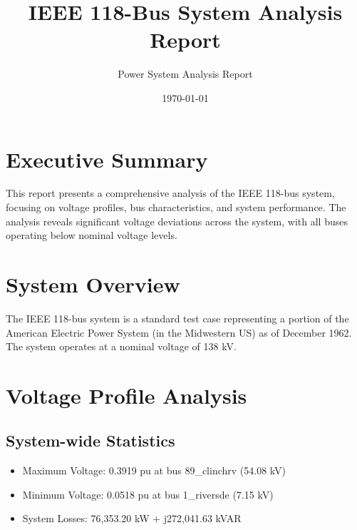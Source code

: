 \documentclass[11pt]{article}
\title{IEEE 118-Bus System Analysis Report}
\author{Power System Analysis Report}
\date{\today}
\begin{document}
\maketitle

\section{Executive Summary}
This report presents a comprehensive analysis of the IEEE 118-bus system, focusing on voltage profiles, bus characteristics, and system performance. The analysis reveals significant voltage deviations across the system, with all buses operating below nominal voltage levels.

\section{System Overview}
The IEEE 118-bus system is a standard test case representing a portion of the American Electric Power System (in the Midwestern US) as of December 1962. The system operates at a nominal voltage of 138 kV.

\section{Voltage Profile Analysis}

\subsection{System-wide Statistics}
\begin{itemize}
    \item Maximum Voltage: 0.3919 pu at bus 89\_clinchrv (54.08 kV)
    \item Minimum Voltage: 0.0518 pu at bus 1\_riversde (7.15 kV)
    \item System Losses: 76,353.20 kW + j272,041.63 kVAR
\end{itemize}
\end{document}
